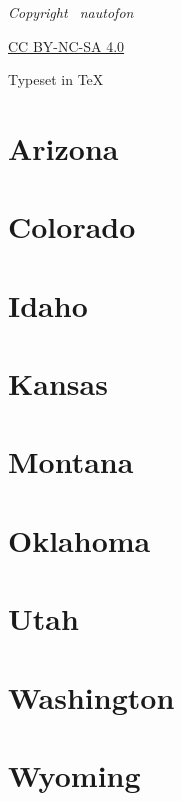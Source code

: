 {
\centering \vspace{30mm} \footnotesize \itshape
Copyright \raisebox{.2ex}{\scriptsize\copyright} \the\year\ nautofon \par
\vspace{.4ex}
\href{https://creativecommons.org/licenses/by-nc-sa/4.0/}{CC BY-NC-SA 4.0} \par
\vspace{.4ex}
Typeset in \TeX \par
}
\thispagestyle{empty}

\tableofcontents
\thispagestyle{empty}

\chapter{Arizona}


\chapter{Colorado}


\chapter{Idaho}


\chapter{Kansas}


\chapter{Montana}


\chapter{Oklahoma}


\chapter{Utah}


\chapter{Washington}


\chapter{Wyoming}



